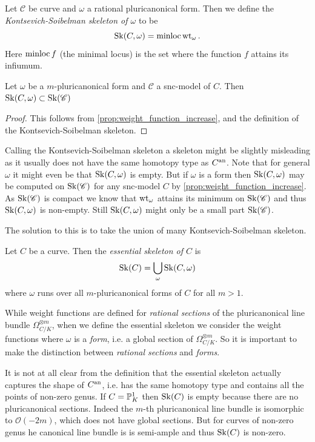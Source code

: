 \begin{definition}\label{def:KS_skeleton}
	Let $\mathscr C $ be curve and $\omega$ a rational pluricanonical form. 
	Then we define the \emph{Kontsevich-Soibelman skeleton of $\omega$} to be \[
		\operatorname{Sk}(C, \omega) = \operatorname{minloc} \operatorname{wt}_{\omega}
	.\]  
	Here $\operatorname{minloc} f$ (the minimal locus) is the set where the function $f$ attains its infiumum.
\end{definition}
\begin{lemma}
	Let $\omega$ be a $m$-pluricanonical form and $\mathscr C$ a snc-model of $C$. 
	Then $\operatorname{Sk}(C, \omega) \subset  \operatorname{Sk}(\mathscr C)$
\end{lemma}
\begin{proof}
	This follows from \cref{prop:weight_function_increase}, and the definition of the Kontsevich-Soibelman skeleton. 
\end{proof}
Calling the Kontsevich-Soibelman skeleton a skeleton might be slightly misleading as it usually does not have the same homotopy type as $C{}^{\text{an}}$. 
Note that for general $\omega$ it might even be that $\operatorname{Sk}(C, \omega)$ is empty. 
But if $\omega$ is a form then $\operatorname{Sk}(C, \omega)$ may be computed on $\operatorname{Sk} (\mathscr C)$ for any snc-model $C$ by \cref{prop:weight_function_increase}. 
As $\operatorname{Sk}(\mathscr C)$ is compact we know that $\operatorname{wt}_{\omega}$ attains its minimum on $\operatorname{Sk}(\mathscr C)$ and thus $\operatorname{Sk}(C, \omega)$ is non-empty. 
Still $\operatorname{Sk}(C, \omega)$ might only be a small part $\operatorname{Sk}(\mathscr C)$. 

The solution to this is to take the union of many Kontsevich-Soibelman skeleton.
\begin{definition}
	Let $C$ be a curve. 
	Then the \emph{essential skeleton of $C$} is \[
		\operatorname{Sk}(C) = \bigcup_{\omega} \operatorname{Sk}(C, \omega)
	\] 
	where $\omega$ runs over all $m$-pluricanonical forms of $C$ for all $m > 1$. 
\end{definition}

\begin{remark}
	While weight functions are defined for \emph{rational sections} of the pluricanonical line bundle $\Omega_{C / K}^{\otimes m}$, when we define the essential skeleton we consider the weight functions where $\omega$ is a \emph{form}, i.e. a global section of $\Omega_{C / K} ^{\otimes m}$. 
	So it is important to make the distinction between \emph{rational sections} and \emph{forms}.
\end{remark}

It is not at all clear from the definition that the essential skeleton actually captures the shape of $C{}^{\text{an}}$, i.e. has the same homotopy type and contains all the points of non-zero genus. 
If $C = \mathbb{P}^{1}_K$ then $\operatorname{Sk}(C)$ is empty because there are no pluricanonical sections. Indeed the $m$-th pluricanonical line bundle is isomorphic to  $\mathcal{O}(-2m)$, which does not have global sections. 
But for curves of non-zero genus he canonical line bundle is is semi-ample and thus $\operatorname{Sk}(C)$ is non-zero. 

